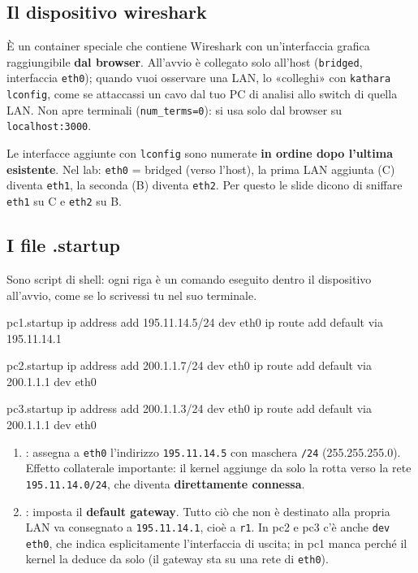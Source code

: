 \subsection{Il dispositivo wireshark}
\begin{intuizione}
È un container speciale che contiene Wireshark con un'interfaccia grafica raggiungibile \textbf{dal browser}. All'avvio è collegato solo all'host (\texttt{bridged}, interfaccia \texttt{eth0}); quando vuoi osservare una LAN, lo «colleghi» con \texttt{kathara lconfig}, come se attaccassi un cavo dal tuo PC di analisi allo switch di quella LAN. Non apre terminali (\texttt{num\_terms=0}): si usa solo dal browser su \texttt{localhost:3000}.
\end{intuizione}
\begin{attenzione}
Le interfacce aggiunte con \texttt{lconfig} sono numerate \textbf{in ordine dopo l'ultima esistente}. Nel lab: \texttt{eth0} = bridged (verso l'host), la prima LAN aggiunta (C) diventa \texttt{eth1}, la seconda (B) diventa \texttt{eth2}. Per questo le slide dicono di sniffare \texttt{eth1} su C e \texttt{eth2} su B.
\end{attenzione}

\subsection{I file .startup}
Sono script di shell: ogni riga è un comando eseguito dentro il dispositivo all'avvio, come se lo scrivessi tu nel suo terminale.

\begin{filecfg}{pc1.startup}
ip address add 195.11.14.5/24 dev eth0
ip route add default via 195.11.14.1
\end{filecfg}
\begin{filecfg}{pc2.startup}
ip address add 200.1.1.7/24 dev eth0
ip route add default via 200.1.1.1 dev eth0
\end{filecfg}
\begin{filecfg}{pc3.startup}
ip address add 200.1.1.3/24 dev eth0
ip route add default via 200.1.1.1 dev eth0
\end{filecfg}
\begin{tecnica}
\begin{enumerate}
  \item {}: assegna a \texttt{eth0} l'indirizzo \texttt{195.11.14.5} con maschera \texttt{/24} (255.255.255.0). Effetto collaterale importante: il kernel aggiunge da solo la rotta verso la rete \texttt{195.11.14.0/24}, che diventa \textbf{direttamente connessa}.
  \item {}: imposta il \textbf{default gateway}. Tutto ciò che non è destinato alla propria LAN va consegnato a \texttt{195.11.14.1}, cioè a \texttt{r1}. In pc2 e pc3 c'è anche \texttt{dev eth0}, che indica esplicitamente l'interfaccia di uscita; in pc1 manca perché il kernel la deduce da solo (il gateway sta su una rete di \texttt{eth0}).
\end{enumerate}
\end{tecnica}

